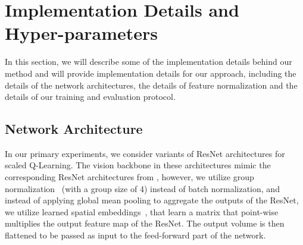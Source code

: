 \begin{table}[h]
    \centering
    \centering
    \vspace{-0.1cm}
    \caption{\footnotesize{{\textbf{Scaled QL with and without conservatism in terms of IQM human-normalized score in the 40-game setting} with ResNet 101. Observe that utilizing conservatism via CQL is still beneficial.}}} 
    \label{tab:ablation_no_pessimism_40_game}
    \vspace{0.25cm}
\end{table}


\section{Implementation Details and Hyper-parameters}

In this section, we will describe some of the implementation details behind our method and will provide implementation details for our approach, including the details of the network architectures, the details of feature normalization and the details of our training and evaluation protocol.

\subsection{Network Architecture}
\label{sec:arch}

In our primary experiments, we consider variants of ResNet architectures for scaled Q-Learning. The vision backbone in these architectures mimic the corresponding ResNet architectures from \citet{resnet}, however, we utilize group normalization~\citep{wu2018group} (with a group size of 4) instead of batch normalization, and instead of applying global mean pooling to aggregate the outputs of the ResNet, we utilize learned spatial embeddings~\citep{anonymous2021ptr}, that learn a matrix that point-wise multiplies the output feature map of the ResNet. The output volume is then flattened to be passed as input to the feed-forward part of the network.

